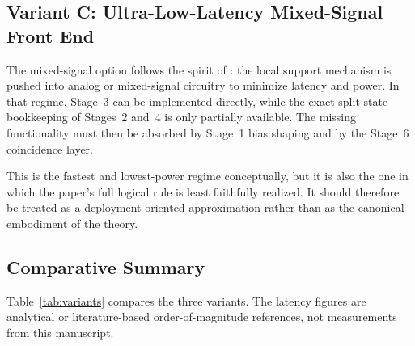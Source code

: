 \documentclass[a4paper,fleqn]{cas-dc}
\begin{document}
\subsection{Variant C: Ultra-Low-Latency Mixed-Signal Front End}
\label{sec:variant_lowlat}

The mixed-signal option follows the spirit of \citet{liu2019mixed}: the local support mechanism is pushed into analog or mixed-signal circuitry to minimize latency and power. In that regime, Stage~3 can be implemented directly, while the exact split-state bookkeeping of Stages~2 and~4 is only partially available. The missing functionality must then be absorbed by Stage~1 bias shaping and by the Stage~6 coincidence layer.

This is the fastest and lowest-power regime conceptually, but it is also the one in which the paper's full logical rule is least faithfully realized. It should therefore be treated as a deployment-oriented approximation rather than as the canonical embodiment of the theory.

\subsection{Comparative Summary}
\label{sec:variant_summary}

Table~\ref{tab:variants} compares the three variants. The latency figures are analytical or literature-based order-of-magnitude references, not measurements from this manuscript.
\end{document}
